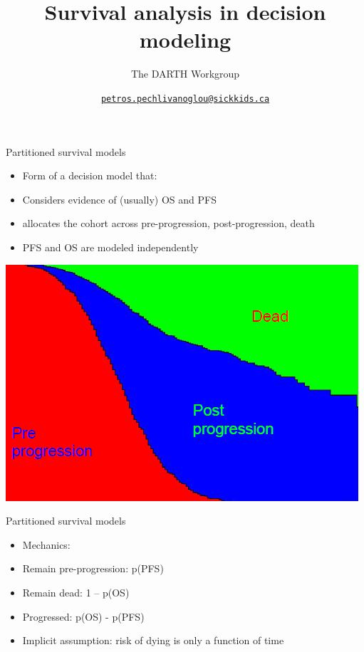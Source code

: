 \documentclass[ignorenonframetext,]{beamer}
\title{Survival analysis in decision modeling}
\subtitle{The DARTH Workgroup}
\author{\href{mailto:petros.pechlivanoglou@sickkids.ca}{\nolinkurl{petros.pechlivanoglou@sickkids.ca}}}
\date{}
\providecommand{\tightlist}{%
  \setlength{\itemsep}{0pt}\setlength{\parskip}{0pt}}
\begin{document}
\frame{\titlepage}

\begin{frame}

\end{frame}

\begin{frame}{Partitioned survival models}

\begin{itemize}
\tightlist
\item
  Form of a decision model that:
\item
  Considers evidence of (usually) OS and PFS
\item
  allocates the cohort across pre-progression, post-progression, death
\item
  PFS and OS are modeled independently
\end{itemize}

\end{frame}

\begin{frame}

\includegraphics[width=1\linewidth]{figures/psm}

\end{frame}

\begin{frame}{Partitioned survival models}

\begin{itemize}
\item
  Mechanics:
\item
  Remain pre-progression: p(PFS)
\item
  Remain dead: 1 -- p(OS)
\item
  Progressed: p(OS) - p(PFS)
\item
  Implicit assumption: risk of dying is only a function of time
\end{itemize}

\end{frame}
\end{document}
